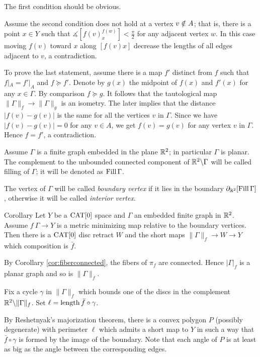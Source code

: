 \documentclass{article}
\begin{document}
The first condition should be obvious.

Assume the second condition does not hold at a vertex $v\zz\notin A$;
that is, there is a point $x\in Y$ such that
$\measuredangle[f(v)^{f(w)}_x]< \tfrac\pi2$
for any adjacent vertex $w$.
In this case moving $f(v)$ toward $x$ along $[f(v)x]$ decrease the lengths of all edges adjacent to $v$, a contradiction.


To prove the last statement, assume there is a map $f'$ distinct from $f$ such that $f|_A=f'|_A$ and $f\succcurlyeq f'$.
Denote by $g(x)$ the midpoint of $f(x)$ and $f'(x)$ for any $x\in \Gamma$. 
By comparison $f\succcurlyeq g$.
It follows that the tautological map $\|\Gamma\|_f\to \|\Gamma\|_g$ is an isometry.
The later implies that the distance $|f(v)-g(v)|$ is the same for all the vertices $v$ in $\Gamma$.
Since we have $|f(v)-g(v)|=0$ for any $v\in A$,
we get $f(v)=g(v)$ for any vertex $v$ in $\Gamma$.
Hence $f=f'$, a contradiction.
\qeds

Assume $\Gamma$ is a finite graph embedded in the plane $\mathbb{R}^2$;
in particular $\Gamma$ is planar.
The complement to the unbounded connected component of $\mathbb{R}^2\backslash\Gamma$ will be called filling of $\Gamma$;
it will be denoted as $\mathop{\rm Fill}\Gamma$.

The vertex of $\Gamma$ will be called \emph{boundary vertex}
if it lies in the boundary $\partial_{\mathbb{R}^2}[\mathop{\rm Fill}\Gamma]$,
otherwise it will be called \emph{interior vertex}.

\begin{thm}{Corollary}\label{cor:planar-minimizing-graph}
Let $Y$ be a $\mathop{\rm CAT}\nolimits[0]$ space and
$\Gamma$ an embedded finite graph in $\mathbb{R}^2$.
Assume $f\:\Gamma\to Y$ is a metric minimizing map relative to the boundary vertices. 
Then there is a $\mathop{\rm CAT}\nolimits[0]$ disc retract $W$
and the short maps $\|\Gamma\|_f\to W\to Y$ which composition is 
 $\bar f$.
\end{thm}


By Corollary \ref{cor:fiberconnected}, the fibers of $\pi_f$ are connected.
Hence $|\Gamma|_f$ is 
a planar graph and so is $\|\Gamma\|_f$.


Fix a cycle $\gamma$ in $\|\Gamma\|_f$ which bounds one of the discs in the complement $\mathbb{R}^2\backslash \|\Gamma\|_f$.
Set $\ell=\mathop{\rm length}\nolimits \bar f\circ\gamma$.

By Reshetnyak's majorization theorem, there is a convex polygon $P$ (possibly degenerate) with perimeter $\ell$ which admits 
a short map to $Y$ in such a way that $\bar f\circ\gamma$ is formed by the image of the boundary.
Note that each angle of $P$ is at least as big as 
the angle between the corresponding edges.
\end{document}
